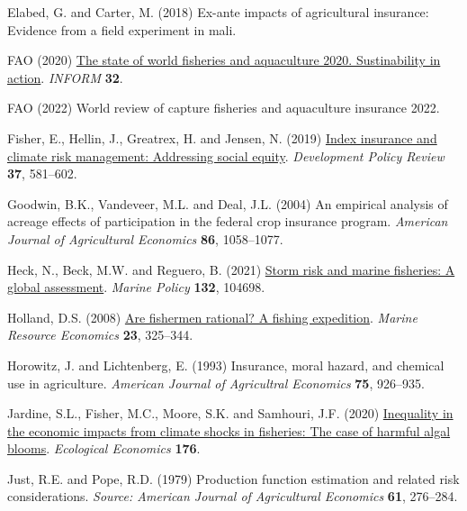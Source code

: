 \documentclass[
  letterpaper,
  DIV=11,
  numbers=noendperiod]{scrartcl}
\newlength{\cslhangindent}
\newlength{\cslentryspacingunit} %
\newenvironment{CSLReferences}[2] %
 {%
  \setlength{\parindent}{0pt}
  \ifodd #1
  \let\oldpar\par
  \def\par{\hangindent=\cslhangindent\oldpar}
  \fi
  \setlength{\parskip}{#2\cslentryspacingunit}
 }%
 {}
\theoremstyle{plain}
\theoremstyle{plain}
\theoremstyle{remark}
\begin{document}
\begin{CSLReferences}{1}{0}
\leavevmode{}%
Elabed, G. and Carter, M. (2018) Ex-ante impacts of agricultural
insurance: Evidence from a field experiment in mali.

\leavevmode{}%
FAO (2020) \href{https://doi.org/10.4060/ca9229en}{The state of world
fisheries and aquaculture 2020. Sustinability in action}. \emph{INFORM}
\textbf{32}.

\leavevmode{}%
FAO (2022) World review of capture fisheries and aquaculture insurance
2022.

\leavevmode{}%
Fisher, E., Hellin, J., Greatrex, H. and Jensen, N. (2019)
\href{https://doi.org/10.1111/dpr.12387}{Index insurance and climate
risk management: Addressing social equity}. \emph{Development Policy
Review} \textbf{37}, 581--602.

\leavevmode{}%
Goodwin, B.K., Vandeveer, M.L. and Deal, J.L. (2004) An empirical
analysis of acreage effects of participation in the federal crop
insurance program. \emph{American Journal of Agricultural Economics}
\textbf{86}, 1058--1077.

\leavevmode{}%
Heck, N., Beck, M.W. and Reguero, B. (2021)
\href{https://doi.org/10.1016/j.marpol.2021.104698}{Storm risk and
marine fisheries: A global assessment}. \emph{Marine Policy}
\textbf{132}, 104698.

\leavevmode{}%
Holland, D.S. (2008)
\href{https://doi.org/10.1086/mre.23.3.42629621}{Are fishermen rational?
A fishing expedition}. \emph{Marine Resource Economics} \textbf{23},
325--344.

\leavevmode{}%
Horowitz, J. and Lichtenberg, E. (1993) Insurance, moral hazard, and
chemical use in agriculture. \emph{American Journal of Agricultral
Economics} \textbf{75}, 926--935.

\leavevmode{}%
Jardine, S.L., Fisher, M.C., Moore, S.K. and Samhouri, J.F. (2020)
\href{https://doi.org/10.1016/j.ecolecon.2020.106691}{Inequality in the
economic impacts from climate shocks in fisheries: The case of harmful
algal blooms}. \emph{Ecological Economics} \textbf{176}.

\leavevmode{}%
Just, R.E. and Pope, R.D. (1979) Production function estimation and
related risk considerations. \emph{Source: American Journal of
Agricultural Economics} \textbf{61}, 276--284.


\end{CSLReferences}
\end{document}
